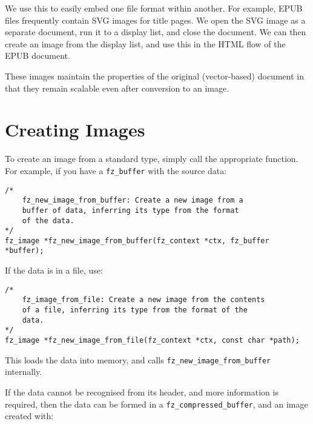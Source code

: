 \documentclass[oneside]{book}
\begin{document}
We use this to easily embed one file format within another. For example, EPUB files frequently contain SVG images for title pages. We open the SVG image as a separate document, run it to a display list, and close the document. We can then create an image from the display list, and use this in the HTML flow of the EPUB document.

These images maintain the properties of the original (vector-based) document in that they remain scalable even after conversion to an image.

\section{Creating Images}

To create an image from a standard type, simply call the appropriate function. For example, if you have a \texttt{fz\_buffer} with the source data:

\begin{lstlisting}
/*
	fz_new_image_from_buffer: Create a new image from a
	buffer of data, inferring its type from the format
	of the data.
*/
fz_image *fz_new_image_from_buffer(fz_context *ctx, fz_buffer *buffer);
\end{lstlisting}

If the data is in a file, use:

\begin{lstlisting}
/*
	fz_image_from_file: Create a new image from the contents
	of a file, inferring its type from the format of the
	data.
*/
fz_image *fz_new_image_from_file(fz_context *ctx, const char *path);
\end{lstlisting}

This loads the data into memory, and calls \texttt{fz\_new\_image\_from\_buffer} internally.

If the data cannot be recognised from its header, and more information is required, then the data can be formed in a \texttt{fz\_compressed\_buffer}, and an image created with:
\end{document}
